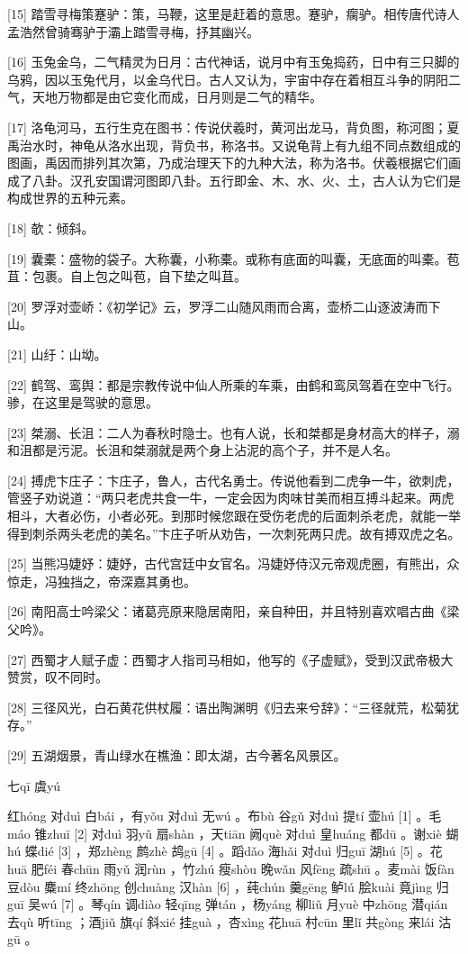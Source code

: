\documentclass[12pt,UTF8]{ctexbook}
\begin{document}
[15] 踏雪寻梅策蹇驴：策，马鞭，这里是赶着的意思。蹇驴，瘸驴。相传唐代诗人孟浩然曾骑骞驴于灞上踏雪寻梅，抒其幽兴。

[16] 玉兔金乌，二气精灵为日月：古代神话，说月中有玉兔捣药，日中有三只脚的乌鸦，因以玉兔代月，以金乌代日。古人又认为，宇宙中存在着相互斗争的阴阳二气，天地万物都是由它变化而成，日月则是二气的精华。

[17] 洛龟河马，五行生克在图书：传说伏羲时，黄河出龙马，背负图，称河图；夏禹治水时，神龟从洛水出现，背负书，称洛书。又说龟背上有九组不同点数组成的图画，禹因而排列其次第，乃成治理天下的九种大法，称为洛书。伏羲根据它们画成了八卦。汉孔安国谓河图即八卦。五行即金、木、水、火、土，古人认为它们是构成世界的五种元素。

[18] 欹：倾斜。

[19] 囊橐：盛物的袋子。大称囊，小称橐。或称有底面的叫囊，无底面的叫橐。苞苴：包裹。自上包之叫苞，自下垫之叫苴。

[20] 罗浮对壶峤：《初学记》云，罗浮二山随风雨而合离，壶桥二山逐波涛而下山。

[21] 山纡：山坳。

[22] 鹤驾、鸾舆：都是宗教传说中仙人所乘的车乘，由鹤和鸾凤驾着在空中飞行。骖，在这里是驾驶的意思。

[23] 桀溺、长沮：二人为春秋时隐士。也有人说，长和桀都是身材高大的样子，溺和沮都是污泥。长沮和桀溺就是两个身上沾泥的高个子，并不是人名。

[24] 搏虎卞庄子：卞庄子，鲁人，古代名勇士。传说他看到二虎争一牛，欲刺虎，管竖子劝说道：“两只老虎共食一牛，一定会因为肉味甘美而相互搏斗起来。两虎相斗，大者必伤，小者必死。到那时候您跟在受伤老虎的后面刺杀老虎，就能一举得到刺杀两头老虎的美名。”卞庄子听从劝告，一次刺死两只虎。故有搏双虎之名。

[25] 当熊冯婕妤：婕妤，古代宫廷中女官名。冯婕妤侍汉元帝观虎圈，有熊出，众惊走，冯独挡之，帝深嘉其勇也。

[26] 南阳高士吟梁父：诸葛亮原来隐居南阳，亲自种田，并且特别喜欢唱古曲《梁父吟》。

[27] 西蜀才人赋子虚：西蜀才人指司马相如，他写的《子虚赋》，受到汉武帝极大赞赏，叹不同时。

[28] 三径风光，白石黄花供杖履：语出陶渊明《归去来兮辞》：“三径就荒，松菊犹存。”

[29] 五湖烟景，青山绿水在樵渔：即太湖，古今著名风景区。





七qī 虞yú


红hóng 对duì 白bái ，有yǒu 对duì 无wú 。布bù 谷gǔ 对duì 提tí 壶hú [1] 。毛máo 锥zhuī [2] 对duì 羽yǔ 扇shàn ，天tiān 阙què 对duì 皇huáng 都dū 。谢xiè 蝴hú 蝶dié [3] ，郑zhèng 鹧zhè 鸪gū [4] 。蹈dǎo 海hǎi 对duì 归guī 湖hú [5] 。花huā 肥féi 春chūn 雨yǔ 润rùn ，竹zhú 瘦shòu 晚wǎn 风fēng 疏shū 。麦mài 饭fàn 豆dòu 麋mí 终zhōng 创chuàng 汉hàn [6] ，莼chún 羹gēng 鲈lú 脍kuài 竟jìng 归guī 吴wú [7] 。琴qín 调diào 轻qīng 弹tán ，杨yáng 柳liǔ 月yuè 中zhōng 潜qián 去qù 听tīng ；酒jiǔ 旗qí 斜xié 挂guà ，杏xìng 花huā 村cūn 里lǐ 共gòng 来lái 沽gū 。
\end{document}

